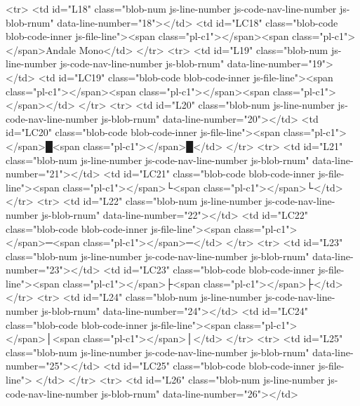         <tr>
          <td id="L18" class="blob-num js-line-number js-code-nav-line-number js-blob-rnum" data-line-number="18"></td>
          <td id="LC18" class="blob-code blob-code-inner js-file-line"><span class="pl-c1">\newfontfamily</span>{<span class="pl-c1">\fallbackfont</span>}{Andale Mono}</td>
        </tr>
        <tr>
          <td id="L19" class="blob-num js-line-number js-code-nav-line-number js-blob-rnum" data-line-number="19"></td>
          <td id="LC19" class="blob-code blob-code-inner js-file-line"><span class="pl-c1">\DeclareTextFontCommand</span>{<span class="pl-c1">\textfallback</span>}{<span class="pl-c1">\fallbackfont</span>}</td>
        </tr>
        <tr>
          <td id="L20" class="blob-num js-line-number js-code-nav-line-number js-blob-rnum" data-line-number="20"></td>
          <td id="LC20" class="blob-code blob-code-inner js-file-line"><span class="pl-c1">\newunicodechar</span>{█}{<span class="pl-c1">\textfallback</span>{█}}</td>
        </tr>
        <tr>
          <td id="L21" class="blob-num js-line-number js-code-nav-line-number js-blob-rnum" data-line-number="21"></td>
          <td id="LC21" class="blob-code blob-code-inner js-file-line"><span class="pl-c1">\newunicodechar</span>{└}{<span class="pl-c1">\textfallback</span>{└}}</td>
        </tr>
        <tr>
          <td id="L22" class="blob-num js-line-number js-code-nav-line-number js-blob-rnum" data-line-number="22"></td>
          <td id="LC22" class="blob-code blob-code-inner js-file-line"><span class="pl-c1">\newunicodechar</span>{─}{<span class="pl-c1">\textfallback</span>{─}}</td>
        </tr>
        <tr>
          <td id="L23" class="blob-num js-line-number js-code-nav-line-number js-blob-rnum" data-line-number="23"></td>
          <td id="LC23" class="blob-code blob-code-inner js-file-line"><span class="pl-c1">\newunicodechar</span>{├}{<span class="pl-c1">\textfallback</span>{├}}</td>
        </tr>
        <tr>
          <td id="L24" class="blob-num js-line-number js-code-nav-line-number js-blob-rnum" data-line-number="24"></td>
          <td id="LC24" class="blob-code blob-code-inner js-file-line"><span class="pl-c1">\newunicodechar</span>{│}{<span class="pl-c1">\textfallback</span>{│}}</td>
        </tr>
        <tr>
          <td id="L25" class="blob-num js-line-number js-code-nav-line-number js-blob-rnum" data-line-number="25"></td>
          <td id="LC25" class="blob-code blob-code-inner js-file-line">
</td>
        </tr>
        <tr>
          <td id="L26" class="blob-num js-line-number js-code-nav-line-number js-blob-rnum" data-line-number="26"></td>
